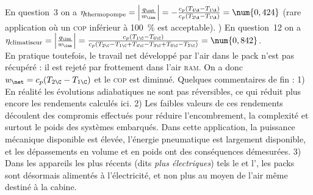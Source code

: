 \begin{description}
			En question~3 on a $\eta_\text{thermopompe} 
			= \left|\frac{q_\out}{w_\inn}\right| 
			= -\frac{c_p (T_{4\A} - T_{1\A})}{c_p (T_{2\A}-T_{1\A})} 
			= \num{0,424}$ (rare application où un \textsc{cop} inférieur à \SI{100}{\percent} est acceptable).
			) En question~12 on a $\eta_\text{climatiseur} = \left|\frac{q_\inn}{w_\inn}\right| = \frac{c_p(T_{1\C} - T_{6\C})}{c_p (T_{2\C} - T_{1\C} + T_{4\C} - T_{3\C} + T_{6\C} - T_{5\C})} = \num{0,842} $.\\
			En pratique toutefois, le travail net développé par l’air dans le pack n’est pas récupéré : il est rejeté par frottement dans l’air \textsc{ram}. On a donc $w_\net = c_p(T_{2\C} - T_{1\C})$ et le \textsc{cop} est diminué.
			\tab Quelques commentaires de fin : 1) En réalité les évolutions adiabatiques ne sont pas réversibles, ce qui réduit plus encore les rendements calculés ici. 2) Les faibles valeurs de ces rendements découlent des compromis effectués pour réduire l’encombrement, la complexité et surtout le poids des systèmes embarqués. Dans cette application, la puissance mécanique disponible est élevée, l’énergie pneumatique est largement disponible, et les dépassements en volume et en poids ont des conséquences démesurées. 3) Dans les appareils les plus récents (dits \textit{plus électriques}) tels le  et l’, les packs sont désormais alimentés à l’électricité, et non plus au moyen de l’air même destiné à la cabine.
\end{description}
